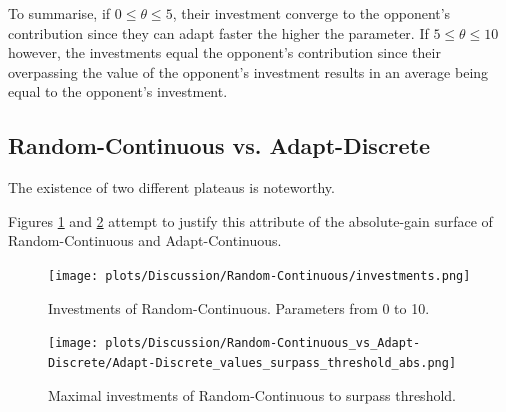 \documentclass{article}
\begin{document}
	To summarise, if $0 \le \theta \le 5$, their investment converge to the opponent's contribution since they can adapt faster the higher the parameter.
	If $5 \le \theta \le 10$ however, the investments equal the opponent's contribution since their overpassing the value of the opponent's investment results in an average being equal to the opponent's investment.\\
\subsection{Random-Continuous vs. Adapt-Discrete}
	The existence of two different plateaus is noteworthy.
	
	Figures \ref{fig:RndC_investm} and \ref{fig:AdpD_surpass_threshold_infl_RndC} attempt to justify this attribute of the absolute-gain surface of Random-Continuous and Adapt-Continuous.
	\begin{figure}[h]
		\begin{center}
			\texttt{[image: plots/Discussion/Random-Continuous/investments.png]}
		\end{center}
		\caption{Investments of Random-Continuous. Parameters from 0 to 10.}
		\label{fig:RndC_investm}
	\end{figure}
	\begin{figure}[h]
		\begin{center}
			\texttt{[image: plots/Discussion/Random-Continuous\_vs\_Adapt-Discrete/Adapt-Discrete\_values\_surpass\_threshold\_abs.png]}\\
		\end{center}
		\caption{Maximal investments of Random-Continuous to surpass threshold.}
		\label{fig:AdpD_surpass_threshold_infl_RndC}
	\end{figure}
	
\end{document}
